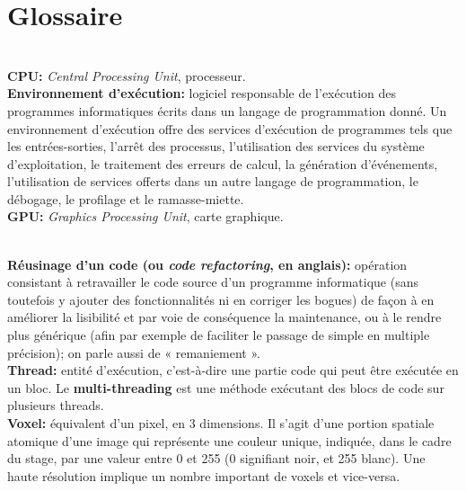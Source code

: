 \documentclass[10pt]{report}
\begin{document}
\chapter*{Glossaire}
\noindent 

\textbf{\\CPU:} \textit{Central Processing Unit}, processeur. \vspace{2cm}
\textbf{\\Environnement d'exécution:}  logiciel responsable de l'exécution des programmes informatiques écrits dans un langage de programmation donné. Un environnement d'exécution offre des services d'exécution de programmes tels que les entrées-sorties, l'arrêt des processus, l'utilisation des services du système d'exploitation, le traitement des erreurs de calcul, la génération d'événements, l'utilisation de services offerts dans un autre langage de programmation, le débogage, le profilage et le ramasse-miette.\vspace{2cm} 
\textbf{\\GPU:} \textit{Graphics Processing Unit}, carte graphique.  \vspace{2cm}

\textbf{\\Réusinage d'un code (ou \textit{code refactoring}, en anglais):} opération consistant à retravailler le code source d'un programme informatique (sans toutefois y ajouter des fonctionnalités ni en corriger les bogues) de façon à en améliorer la lisibilité et par voie de conséquence la maintenance, ou à le rendre plus générique (afin par exemple de faciliter le passage de simple en multiple précision); on parle aussi de « remaniement ».  \vspace{2cm} 
\textbf{\\Thread:} entité d'exécution, c'est-à-dire une partie code qui peut être exécutée en un bloc. Le \textbf{multi-threading} est une méthode exécutant des blocs de code sur plusieurs threads.\vspace{2cm}
\textbf{\\Voxel:} équivalent d'un pixel, en 3 dimensions. Il s'agit d'une portion spatiale atomique d'une image qui représente une couleur unique, indiquée, dans le cadre du stage, par une valeur entre 0 et 255 (0 signifiant noir, et 255 blanc). Une haute résolution implique un nombre important de voxels et vice-versa.  

\end{document}
